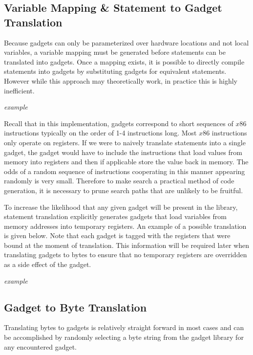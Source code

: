     \subsection{Variable Mapping \& Statement to Gadget Translation}

    Because gadgets can only be parameterized over hardware locations and not
    local variables, a variable mapping must be generated before statements can
    be translated into gadgets. Once a mapping exists, it is possible to
    directly compile statements into gadgets by substituting gadgets for
    equivalent statements. However while this approach may theoretically work,
    in practice this is highly inefficient.
    
    \emph{example}

    Recall that in this implementation, gadgets correspond to short sequences of
    $x86$ instructions typically on the order of 1-4 instructions long. Most
    $x86$ instructions only operate on registers. If we were to naively
    translate statements into a single gadget, the gadget would have to include
    the instructions that load values from memory into registers and then if
    applicable store the value back in memory. The odds of a random sequence of
    instructions cooperating in this manner appearing randomly is very small.
    Therefore to make search a practical method of code generation, it is
    necessary to prune search paths that are unlikely to be fruitful.

    To increase the likelihood that any given gadget will be present in the
    library, statement translation explicitly generates gadgets that load
    variables from memory addresses into temporary registers. An example of a
    possible translation is given below. Note that each gadget is tagged with
    the registers that were bound at the moment of translation. This information
    will be required later when translating gadgets to bytes to ensure that no
    temporary registers are overridden as a side effect of the gadget.

    \emph{example}

    \subsection{Gadget to Byte Translation}

    Translating bytes to gadgets is relatively straight forward in most cases
    and can be accomplished by randomly selecting a byte string from the gadget
    library for any encountered gadget.

